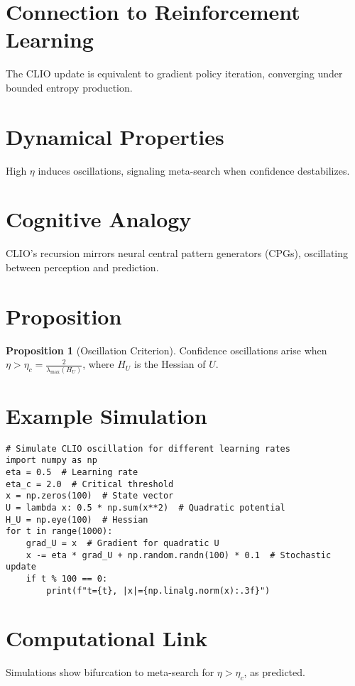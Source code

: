 \documentclass[12pt]{book}
\theoremstyle{definition}
\newtheorem{proposition}{Proposition}[chapter]
\begin{document}
\section{Connection to Reinforcement Learning}
The CLIO update is equivalent to gradient policy iteration, converging under bounded entropy production.

\section{Dynamical Properties}
High \(\eta\) induces oscillations, signaling meta-search when confidence destabilizes.

\section{Cognitive Analogy}
CLIO’s recursion mirrors neural central pattern generators (CPGs), oscillating between perception and prediction.

\section{Proposition}
\begin{proposition}[Oscillation Criterion]
\label{prop:oscillation}
Confidence oscillations arise when \(\eta > \eta_c = \frac{2}{\lambda_{\max}(H_U)}\), where \(H_U\) is the Hessian of \(U\).
\end{proposition}

\section{Example Simulation}
\begin{minipage}{\textwidth}
\begin{lstlisting}[caption={CLIO Oscillation Simulation}, label={lst:clio_code}]
# Simulate CLIO oscillation for different learning rates
import numpy as np
eta = 0.5  # Learning rate
eta_c = 2.0  # Critical threshold
x = np.zeros(100)  # State vector
U = lambda x: 0.5 * np.sum(x**2)  # Quadratic potential
H_U = np.eye(100)  # Hessian
for t in range(1000):
    grad_U = x  # Gradient for quadratic U
    x -= eta * grad_U + np.random.randn(100) * 0.1  # Stochastic update
    if t % 100 == 0:
        print(f"t={t}, |x|={np.linalg.norm(x):.3f}")
\end{lstlisting}
\end{minipage}

\section{Computational Link}
Simulations show bifurcation to meta-search for \(\eta > \eta_c\), as predicted.
\end{document}
